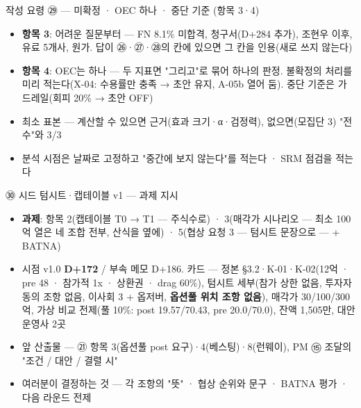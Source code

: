\begin{frame}{작성 요령 ㉙ — 미확정 · OEC 하나 · 중단 기준 (항목 3·4)}
\begin{itemize}
\item \textbf{항목 3}: 어려운 질문부터 — FN 8.1\% 미합격, 청구서(D+284 추가), 조현우 이후, 유료 5개사, 원가. 답이 ㉖·㉗·㉘의 칸에 있으면 그 칸을 인용(새로 쓰지 않는다)
\item \textbf{항목 4}: OEC는 하나 — 두 지표면 "그리고"로 묶어 하나의 판정. 불확정의 처리를 미리 적는다(X-04: 수용률만 충족 → 초안 유지, A-05b 열어 둠). 중단 기준은 가드레일(회피 20\% → 초안 OFF)
\item 최소 표본 — 계산할 수 있으면 근거(효과 크기·α·검정력), 없으면(모집단 3) "전수"와 3/3
\item 분석 시점은 날짜로 고정하고 "중간에 보지 않는다"를 적는다 · SRM 점검을 적는다
\end{itemize}
\end{frame}

\begin{frame}{㉚ 시드 텀시트·캡테이블 v1 — 과제 지시}
\begin{itemize}
\item \textbf{과제}: 항목 2(캡테이블 T0 → T1 — 주식수로) · 3(매각가 시나리오 — 최소 100억 열은 네 조합 전부, 산식을 옆에) · 5(협상 요청 3 — 텀시트 문장으로 — + BATNA)
\item 시점 v1.0 \textbf{D+172} / 부속 메모 D+186. 카드 — 정본 §3.2·K-01·K-02(12억 · pre 48 · 참가적 1x · 상환권 · drag 60\%), 텀시트 세부(참가 상한 없음, 투자자 동의 조항 없음, 이사회 3 + 옵저버, \textbf{옵션풀 위치 조항 없음}), 매각가 30/100/300억, 가상 비교 전제(풀 10\%: post 19.57/70.43, pre 20.0/70.0), 잔액 1,505만, 대안 운영사 2곳
\item 앞 산출물 — ㉑ 항목 3(옵션풀 post 요구)·4(베스팅)·8(런웨이), PM ⑮ 조달의 "조건 / 대안 / 결렬 시"
\item 여러분이 결정하는 것 — 각 조항의 "뜻" · 협상 순위와 문구 · BATNA 평가 · 다음 라운드 전제
\end{itemize}
\end{frame}

